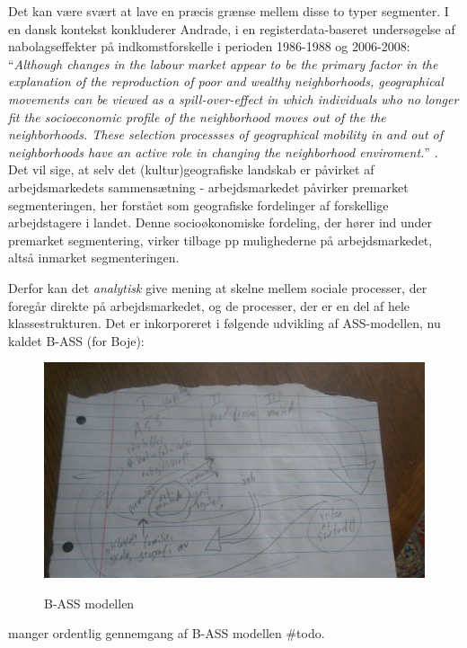Det kan være svært at lave en præcis grænse mellem disse to typer segmenter. I en dansk kontekst konkluderer Andrade, i en registerdata-baseret undersøgelse af nabolagseffekter på indkomstforskelle i perioden 1986-1988 og 2006-2008: “\emph{Although changes in the labour market appear to be the primary factor in the explanation of the reproduction of poor and wealthy neighborhoods, geographical movements can be viewed as a spill-over-effect in which individuals who no longer fit the socioeconomic profile of the neighborhood moves out of the the neighborhoods. These selection processses of geographical mobility in and out of neighborhoods have an active role in changing the neighborhood enviroment.}” \parencite[134]{Andrade2014}. Det vil sige, at selv det (kultur)geografiske landskab er påvirket af arbejdsmarkedets sammensætning - arbejdsmarkedet påvirker premarket segmenteringen, her forstået som geografiske fordelinger af forskellige arbejdstagere i landet. Denne socioøkonomiske fordeling, der hører ind under premarket segmentering, virker tilbage pp mulighederne på arbejdsmarkedet, altså inmarket segmenteringen. 

Derfor kan det \emph{analytisk} give mening at skelne mellem sociale processer, der foregår direkte på arbejdsmarkedet, og de processer, der er en del af hele klassestrukturen. Det er inkorporeret i følgende udvikling af ASS-modellen, nu kaldet B-ASS (for Boje): 
%
\begin{figure}[H]
\begin{centering}
	\caption{B-ASS modellen}
	\includegraphics[width=\textwidth]{fig/B-ASS-model.jpg}
	\label{fig_B-ASSmodel}
\end{centering}
\end{figure}
%

manger ordentlig gennemgang af B-ASS modellen \#todo.


